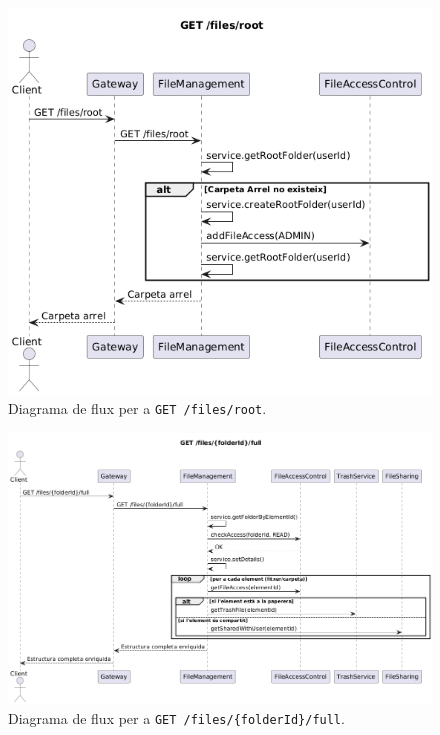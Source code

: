 \begin{figure}[H]
    \centering
    \includegraphics[width=1\textwidth]{Figures/flux/get_root.png}
    \caption{Diagrama de flux per a \texttt{GET /files/root}.}
    \label{fig:flow_get_root}
\end{figure}

\begin{figure}[H]
    \centering
    \includegraphics[width=1\textwidth]{Figures/flux/get_files_full.png}
    \caption{Diagrama de flux per a \texttt{GET /files/\{folderId\}/full}.}
    \label{fig:flow_get_files_full}
\end{figure}

